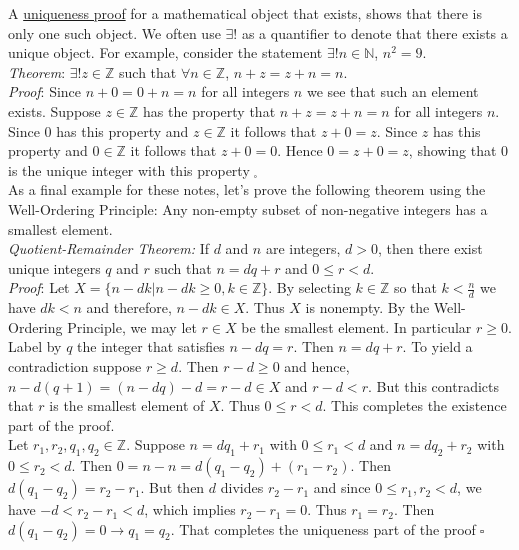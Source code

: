 \documentclass[12pt]{amsart}
\theoremstyle{definition}
\theoremstyle{remark}
\newcommand{\nats}{\mathbb N}
\newcommand{\ints}{\mathbb Z}
\begin{document}
\newpage

A \underline{uniqueness proof} for a mathematical object that exists, shows that there is only one such object.  We often use $\exists !$ as a quantifier to denote that there exists a unique object.  For example, consider the statement $\exists! n\in\nats$, $n^{2}=9$.\\


\emph{Theorem}:  $\exists !z\in\ints$ such that $\forall n\in\ints$, $n+z=z+n=n$.\\

\emph{Proof}:  Since $n+0=0+n=n$ for all integers $n$ we see that such an element exists.  Suppose $z\in\ints$ has the property that $n+z=z+n=n$ for all integers $n$.  Since $0$ has this property and $z\in\ints$ it follows that $z+0=z$.  Since $z$ has this property and $0\in\ints$ it follows that $z+0=0$.  Hence $0=z+0=z$, showing that $0$ is the unique integer with this property$\;_{\square}$ \\

As a final example for these notes, let's prove the following theorem using the Well-Ordering Principle:  Any non-empty subset of non-negative integers has a smallest element.\\

\emph{Quotient-Remainder Theorem:}  If $d$ and $n$ are integers, $d>0$, then there exist unique integers $q$ and $r$ such that $n=dq+r$ and $0\leq r<d$.\\


\emph{Proof}:  Let $X=\{n-dk|n-dk\geq 0, k\in\ints \}$.  By selecting $k\in\ints$ so that $k<\frac{n}{d}$ we have $dk<n$ and therefore, $n-dk\in X$.  Thus $X$ is nonempty.  By the Well-Ordering Principle, we may let $r\in X$ be the smallest element.  In particular $r\geq 0$.  Label by $q$ the integer that satisfies $n-dq=r$.  Then $n=dq+r$.  To yield a contradiction suppose $r\geq d$.  Then $r-d\geq 0$ and hence, $n-d(q+1)=(n-dq)-d=r-d\in X$ and $r-d<r$.  But this contradicts that $r$ is the smallest element of $X$.  Thus $0\leq r<d$.  This completes the existence part of the proof.\\

Let $r_{1},r_{2},q_{1},q_{2}\in \ints$.  Suppose $n=dq_{1}+r_{1}$ with $0\leq r_{1}<d$ and $n=dq_{2}+r_{2}$ with $0\leq r_{2}<d$.  Then $0=n-n=d(q_{1}-q_{2})+(r_{1}-r_{2})$.  Then $d(q_{1}-q_{2})=r_{2}-r_{1}$.  But then $d$ divides $r_{2}-r_{1}$ and since $0\leq r_{1},r_{2}<d$, we have $-d<r_{2}-r_{1}<d$, which implies $r_2-r_1=0$.  Thus $r_{1}=r_{2}$.  Then $d(q_{1}-q_{2})=0\rightarrow q_{1}=q_{2}$.  That completes the uniqueness part of the proof$\;\square$
\end{document}

